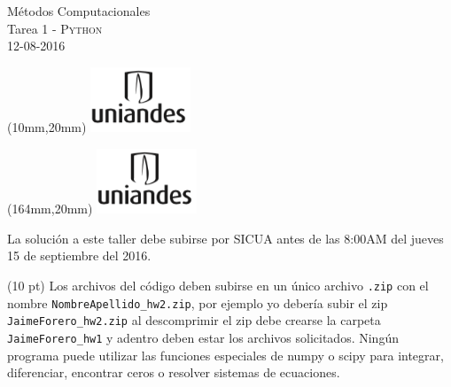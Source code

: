 \documentclass[11pt,letterpaper]{exam}
\begin{document}
\begin{center}
{\Large M\'etodos Computacionales} \\
Tarea 1 - \textsc{Python}\\
12-08-2016\\
\end{center}

\begin{textblock*}{40mm}(10mm,20mm)
  \includegraphics[width=3cm]{logoUniandes.png}
\end{textblock*}

\begin{textblock*}{40mm}(164mm,20mm)
  \includegraphics[width=3cm]{logoUniandes.png}
\end{textblock*}

\vspace{0.3cm}

\noindent
La solución a este taller debe subirse por SICUA antes de las 8:00AM
del jueves 15 de septiembre del 2016. 
\noindent

(10 pt) Los archivos del c\'odigo  deben subirse en un
\'unico archivo \verb".zip" con el nombre
\verb"NombreApellido_hw2.zip", por ejemplo yo deber\'ia subir el zip
\verb"JaimeForero_hw2.zip" al descomprimir el zip debe crearse la
carpeta \verb"JaimeForero_hw1" y adentro deben estar los archivos
solicitados.
Ning\'un programa puede utilizar las funciones especiales de numpy o
scipy para integrar, diferenciar, encontrar ceros o resolver sistemas
de ecuaciones. 


\vspace{0.3cm}
\end{document}
